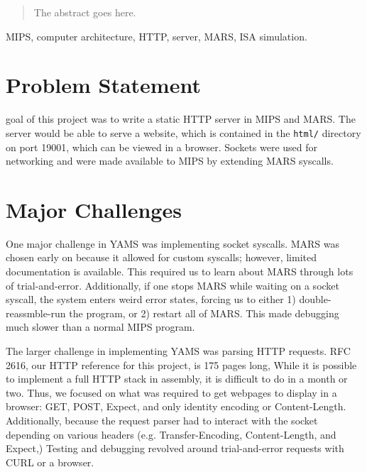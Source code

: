 \documentclass[journal,10pt]{IEEEtran}
\begin{document}
\maketitle

\begin{abstract}
The abstract goes here.
\end{abstract}

\begin{IEEEkeywords}
MIPS, computer architecture, HTTP, server, MARS, ISA simulation.
\end{IEEEkeywords}


\section{Problem Statement}
%
%
 goal of this project was to write a static HTTP server in MIPS and MARS. The server would be able to serve a website, which is contained in the \texttt{html/} directory on port 19001, which can be viewed in a browser. Sockets were used for networking and were made available to MIPS by extending MARS syscalls.


\section{Major Challenges}

One major challenge in YAMS was implementing socket syscalls.
MARS was chosen early on because it allowed for custom syscalls; however,
limited documentation is available. This required us to learn about MARS
through lots of trial-and-error. Additionally, if one stops MARS while
waiting on a socket syscall, the system enters weird error states, forcing
us to either 1) double-reassmble-run the program, or 2) restart all of MARS.
This made debugging much slower than a normal MIPS program.

The larger challenge in implementing YAMS was parsing HTTP requests. RFC 2616,
our HTTP reference for this project, is 175 pages long, While it is possible
to implement a full HTTP stack in assembly, it is difficult to do in a month
or two. Thus, we focused on what was required to get webpages to display in a
browser: GET, POST, Expect, and only identity encoding or Content-Length.
Additionally, because the request parser had to interact with the socket
depending on various headers (e.g. Transfer-Encoding, Content-Length, and
Expect,) Testing and debugging revolved around trial-and-error requests
with CURL or a browser.
\end{document}

